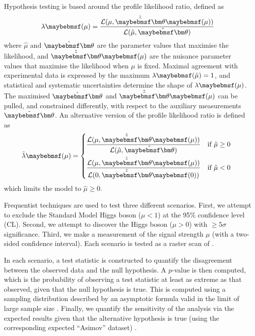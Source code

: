 Hypothesis testing is based around the profile likelihood ratio, defined as
\begin{equation}
	\lambda\parenths{\mu} = \frac{\mathcal{L}(\mu, \hat{\hat{\bvec{\theta}}}\parenths{\mu})}{\mathcal{L}(\hat{\mu}, \hat{\bvec{\theta}})}
\end{equation}
where $\hat{\mu}$ and $\hat{\bvec{\theta}}$ are the parameter values that maximise the 
likelihood, and $\hat{\hat{\bvec{\theta}}}\parenths{\mu}$ are the nuisance parameter values 
that maximise the likelihood when $\mu$ is fixed. Maximal agreement with experimental data 
is expressed by the maximum $\lambda\parenths{\hat{\mu}} = 1$, and statistical and 
systematic uncertainties determine the shape of $\lambda\parenths{\mu}$. The maximised 
$\hat{\bvec{\theta}}$ and $\hat{\hat{\bvec{\theta}}}\parenths{\mu}$ can be pulled, and 
constrained differently, with respect to the auxiliary measurements $\tilde{\bvec{\theta}}$. 
An alternative version of the profile likelihood ratio is defined as
\begin{equation}
	\tilde{\lambda}\parenths{\mu} = 
	\begin{dcases*}
		\frac{\mathcal{L}(\mu, \hat{\hat{\bvec{\theta}}}\parenths{\mu})}{\mathcal{L}(\hat{\mu}, \hat{\bvec{\theta}})} & if $\hat{\mu} \geq 0$ \\
		\frac{\mathcal{L}(\mu, \hat{\hat{\bvec{\theta}}}\parenths{\mu})}{\mathcal{L}(0, \hat{\hat{\bvec{\theta}}}\parenths{0})} & if $\hat{\mu} < 0$
	\end{dcases*}
\end{equation}
which limits the model to $\hat{\mu} \geq 0$.

Frequentist techniques are used to test three different scenarios. First, we attempt to 
exclude the Standard Model Higgs boson (\ie $\mu < 1$) at the 95\% confidence level (CL). 
Second, we attempt to discover the Higgs boson (\ie $\mu > 0$) with $\geq\!5\sigma$ 
significance. Third, we make a measurement of the signal strength $\mu$ (\ie with a 
two-sided confidence interval). Each scenario is tested as a raster scan of \mH.

In each scenario, a test statistic is constructed to quantify the disagreement between the 
observed data and the null hypothesis. A $p$-value is then computed, which is the 
probability of observing a test statistic at least as extreme as that observed, given that 
the null hypothesis is true. This is computed using a sampling distribution described by an 
asymptotic formula valid in the limit of large sample size \cite{Cowan:2010}. Finally, we 
quantify the sensitivity of the analysis via the expected results given that the alternative 
hypothesis is true (using the corresponding expected ``Asimov'' dataset) \cite{Cowan:2010}.

